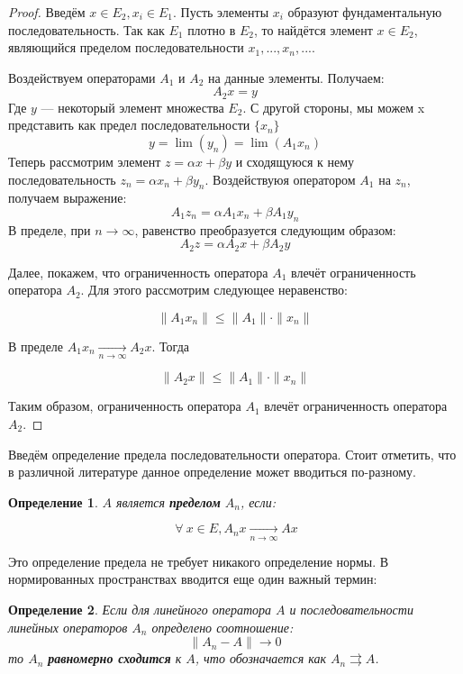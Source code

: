 \documentclass[12pt]{article}
\let\foralltemp\forall
\renewcommand{\forall}{\: \foralltemp \:}
\newcommand{\norm}[1]{\| #1 \|}
\renewcommand{\leq}{\leqslant}
\newtheorem{defi}{Определение}[section]
\begin{document}
	\begin{proof}
		Введём $x \in E_2, x_i \in E_1$. Пусть элементы $x_i$ образуют фундаментальную последовательность. Так как $E_1$ плотно в $E_2$,
		то найдётся элемент $x \in E_2$, являющийся пределом последовательности $x_1, ..., x_n, ...$.
		
		Воздействуем операторами $A_1$ и $A_2$ на данные элементы. Получаем:
		$$A_2 x = y$$ 
		Где $y$ --- некоторый элемент множества $E_2$. С другой стороны, мы можем x представить как предел последовательности $\{x_n\}$
		$$y = \lim (y_n) = \lim(A_1 x_n)$$
		Теперь рассмотрим элемент $z = \alpha x + \beta y$ и сходящуюся к нему последовательность $z_n = \alpha x_n + \beta y_n$.
		Воздействуюя оператором $A_1$ на $z_n$, получаем выражение:
		$$A_1 z_n = \alpha A_1 x_n + \beta A_1 y_n$$
		В пределе, при $n \rightarrow \infty$, равенство преобразуется следующим образом:
		$$A_2 z = \alpha A_2 x + \beta A_2 y$$
		
		Далее, покажем, что ограниченность оператора $A_1$ влечёт ограниченность оператора $A_2$. Для этого рассмотрим следующее 
		неравенство:
		
		$$\norm{A_1 x_n} \leq \norm{A_1} \cdot \norm{x_n}$$
		
		В пределе $A_1 x_n \underset{n \rightarrow \infty}{\rightarrow} A_2 x$. Тогда
		
		$$\norm{A_2 x} \leq \norm{A_1} \cdot \norm{x_n}$$
		
		Таким образом, ограниченность оператора $A_1$ влечёт ограниченность оператора $A_2$.
	\end{proof}
	
	Введём определение предела последовательности оператора. Стоит отметить, что в различной литературе данное определение может вводиться
	по-разному.
	
	\begin{defi}
		$A$ является \textbf{пределом} $A_n$, если:
		
		$$\forall x \in E, A_n x \underset{n \rightarrow \infty}{\rightarrow} A x$$
	\end{defi}
	Это определение предела не требует никакого определение нормы. В нормированных пространствах вводится еще один 
	важный термин:
	
	\begin{defi}
		Если для линейного оператора $A$ и последовательности линейных операторов $A_n$ определено соотношение:
		$$\norm{A_n - A} \rightarrow 0$$
		то $A_n$ \textbf{равномерно сходится} к $A$, что обозначается как $A_n \rightrightarrows A$.
	\end{defi}
	
\end{document}
